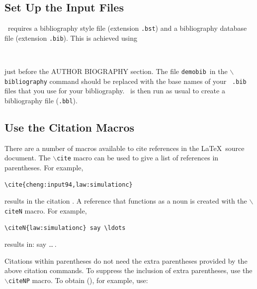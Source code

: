 \documentclass{wscpaperproc}
\theoremstyle{wsc}
\begin{document}
\subsection{Set Up the \texorpdfstring{\BibTeX}{BibTex} Input Files}

\BibTeX\ requires a bibliography style file (extension \texttt{.bst}) and a bibliography database file (extension \texttt{.bib}). This is achieved
using\newline


\begin{verbatim}


\end{verbatim}\vspace{5mm}

\noindent just before the AUTHOR BIOGRAPHY section. The file {\tt demobib}\ in the {\tt $\backslash$bibliography} command should be replaced with the base names of your \BibTeX\ {\tt *.bib} files that you use for your bibliography. \BibTeX\ is then run as usual to create a bibliography file ({\tt *.bbl}).

\subsection{Use the Citation Macros}
There are a number of macros available to cite references in the \LaTeX\ source document. The {\tt $\backslash$cite} macro can be used to give a list of references in parentheses. For example,\newline

\begin{verbatim}
\cite{cheng:input94,law:simulationc}
\end{verbatim}\vspace{5mm}

\noindent results in the citation \cite{cheng:input94,law:simulationc}. A reference that functions as a noun is created with the {\tt $\backslash$citeN}
macro. For example,\newline


\begin{verbatim}
\citeN{law:simulationc} say \ldots
\end{verbatim}\vspace{5mm}

\noindent results in:  say \ldots\,.

Citations within parentheses do not need the extra parentheses provided by the above citation commands. To suppress the inclusion of extra parentheses, use the {\tt $\backslash$citeNP} macro. To obtain (), for example, use:\newline
\end{document}
